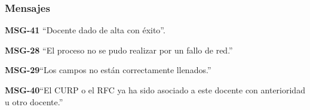 \subsubsection{Mensajes}

\begin{Citemize}
    \item {\bf MSG-41} ``Docente dado de alta con éxito''.
    \item {\bf MSG-28}  ``El proceso no se pudo realizar por un fallo de red.''
    \item {\bf MSG-29}{``Los campos no están correctamente llenados.''}
    \item {\bf MSG-40}{``El CURP o el RFC ya ha sido asociado a este docente con anterioridad u otro docente.''}
\end{Citemize}

